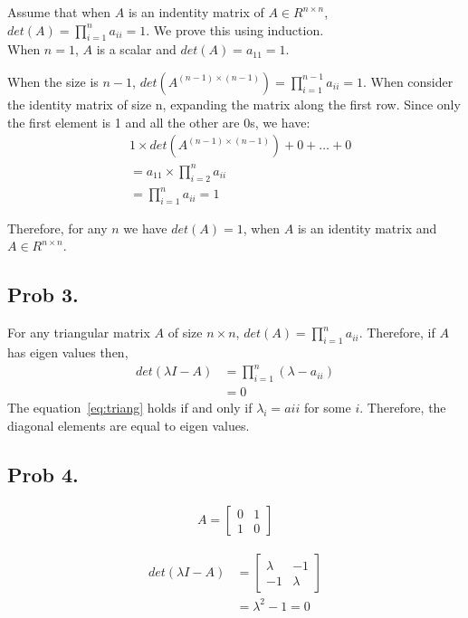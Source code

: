 \documentclass[10pt,a4paper]{article}
\begin{document}
Assume that when $A$ is an indentity matrix of $A\in R^{n\times n}$, $det(A) = \prod_{i=1}^{n}{a_{ii}} = 1$. We prove this using induction.\\

When $n=1$, $A$ is a scalar and $det(A) = a_{11} = 1$. 

When the size is $n-1$, $det(A^{(n-1)\times (n-1)}) = \prod_{i=1}^{n-1}{a_{ii}} = 1$. When consider the identity matrix of size n, expanding the matrix along the first row. Since only the first element is 1 and all the other are 0s, we have:
\begin{align*}
&1\times det(A^{(n-1)\times (n-1)}) + 0 +\dots+0 \\
&= a_{11} \times  \prod_{i=2}^{n}{a_{ii}}\\
&=\prod_{i=1}^{n}{a_{ii}} = 1
\end{align*}

Therefore, for any $n$ we have $det(A) = 1$, when $A$ is an identity matrix and $A\in R^{n\times n}$.

\subsection{Prob 3.}
For any triangular matrix $A$ of size $n\times n$, $det(A) = \prod_{i=1}^na_{ii}$. Therefore, if $A$ has eigen values then,
\begin{align}
\label{eq:triang}
det(\lambda I-A) &=\prod_{i=1}^n(\lambda-a_{ii})\\
&=0
\end{align}
The equation~\ref{eq:triang} holds if and only if $\lambda_i = a{ii}$ for some $i$. Therefore, the diagonal elements are equal to eigen values.

\subsection{Prob 4.}
\begin{align*}
	A = \left[ \begin{matrix}
	0 & 1 \\
	1 & 0
	\end{matrix} \right]
\end{align*}

\begin{align*}
det(\lambda I-A) &=\left[ \begin{matrix}
\lambda & -1 \\
-1 & \lambda
\end{matrix} \right]\\
&=\lambda^2-1=0
\end{align*}
\end{document}
